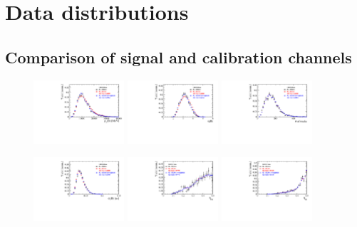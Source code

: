 
\section{Data distributions}
\subsection{Comparison of signal and calibration channels}

\begin{figure}[h]
\centering
\includegraphics[height=!,width=0.3\textwidth]{figs/dataVsMC/norm2signal/Ds2all_Bs_PT.pdf}
\includegraphics[height=!,width=0.3\textwidth]{figs/dataVsMC/norm2signal/Ds2all_Bs_ETA.pdf}
\includegraphics[height=!,width=0.3\textwidth]{figs/dataVsMC/norm2signal/Ds2all_NTracks.pdf}


\includegraphics[height=!,width=0.3\textwidth]{figs/dataVsMC/norm2signal/Ds2all_Bs_DTF_TAUERR.pdf}
\includegraphics[height=!,width=0.3\textwidth]{figs/dataVsMC/norm2signal/Ds2all_Bs_TAGOMEGA_OS.pdf}
\includegraphics[height=!,width=0.3\textwidth]{figs/dataVsMC/norm2signal/Ds2all_Bs_SS_nnetKaon_PROB.pdf}


\end{figure}
